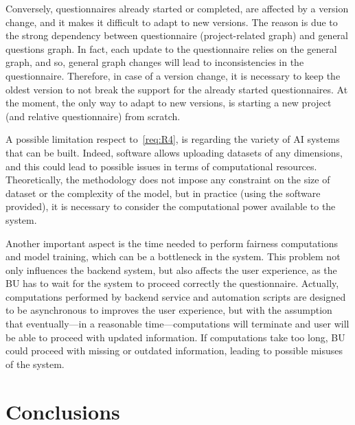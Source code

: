 \documentclass[12pt,a4paper,openright,twoside]{book}
\begin{document}
Conversely, questionnaires already started or completed, are affected by a version change, and it makes it difficult to adapt to new versions.
%
The reason is due to the strong dependency between questionnaire (project-related graph) and general questions graph.
%
In fact, each update to the questionnaire relies on the general graph, and so, general graph changes will lead to inconsistencies in the questionnaire.
%
Therefore, in case of a version change, it is necessary to keep the oldest version to not break the support for the already started questionnaires.
%
At the moment, the only way to adapt to new versions, is starting a new project (and relative questionnaire) from scratch.



A possible limitation respect to~\ref{req:R4}, is regarding the variety of \ac{AI} systems that can be built.
%
Indeed, software allows uploading datasets of any dimensions, and this could lead to possible issues in terms of computational resources.
%
Theoretically, the methodology does not impose any constraint on the size of dataset or the complexity of the model, but in practice (using the software provided), it is necessary to consider the computational power available to the system.

Another important aspect is the time needed to perform fairness computations and model training, which can be a bottleneck in the system.
%
This problem not only influences the backend system, but also affects the user experience, as the \ac{BU} has to wait for the system to proceed correctly the questionnaire.
%
Actually, computations performed by backend service and automation scripts are designed to be asynchronous to improves the user experience, but with the assumption that eventually---in a reasonable time---computations will terminate and user will be able to proceed with updated information.
%
If computations take too long, \ac{BU} could proceed with missing or outdated information, leading to possible misuses of the system.



\chapter{Conclusions}%
\label{chap:conclusions}
\end{document}
